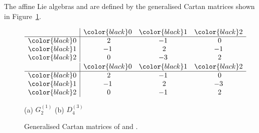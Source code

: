\documentclass[10pt,a4paper]{amsart}
\numberwithin{equation}{section}
\theoremstyle{definition}
\begin{document}
The affine Lie algebras  and  are defined by the generalised Cartan matrices shown in Figure~\ref{fig:CMs}.

\begin{figure}[!t]
 \centering
$\begin{array}{c|ccc}
& {\color{black}0} & {\color{black}1} & {\color{black}2} \\
\hline
 {\color{black}0} & \,\,2 & -1 & \,\,0 \\
 {\color{black}1} & -1 & \,\,2 & -1 \\
 {\color{black}2} & \,\,0 & -3 & \,\,2
\end{array}$ \qquad
$\begin{array}{c|ccc}
& {\color{black}0} & {\color{black}1} & {\color{black}2} \\
\hline
 {\color{black}0} & \,\,2 & -1 & \,\,0 \\
 {\color{black}1} & -1 & \,\,2 & -3 \\
 {\color{black}2} & \,\,0 & -1 & \,\,2
\end{array}$

\vspace{1mm}

(a) $G_2^{(1)}$ \hspace{25mm} (b) $D_4^{(3)}$

\vspace{2mm}

 \caption{Generalised Cartan matrices of  and .}
 \label{fig:CMs}
\end{figure}
\end{document}
